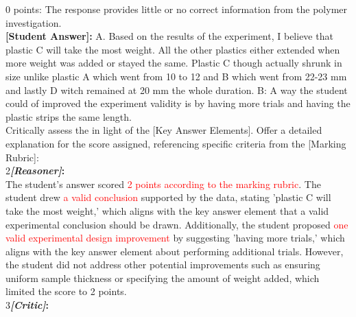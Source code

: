 \begin{figure*}
\begin{tcolorbox}[
    colback=gray!10,      %
    colframe=gray!80,     %
    title=Case Study 4,
    fonttitle=\bfseries,  %
    rounded corners,
    boxrule=0.5mm,        %
    width=\linewidth
]
0 points: The response provides little or no correct information from the polymer investigation.\\
 \textbf{[Student Answer]:} A. Based on the results of the experiment, I believe that plastic C will take the most weight. All the other plastics either extended when more weight was added or stayed the same. Plastic C though actually shrunk in size unlike plastic A which went from 10 to 12 and B which went from 22-23 mm and lastly D witch remained at 20 mm the whole duration. B: A way the student could of improved the experiment validity is by having more trials and having the plastic strips the same length.\\
 Critically assess the  in light of the [Key Answer Elements]. Offer a detailed explanation for the score assigned, referencing specific criteria from the [Marking Rubric]: \\
\textcircled{\raisebox{-0.3pt} {\scriptsize2}}\textbf{\emph{[Reasoner]}:}\\
The student's answer scored \textcolor{red}{2 points according to the marking rubric}. The student drew \textcolor{red}{a valid conclusion} supported by the data, stating 'plastic C will take the most weight,' which aligns with the key answer element that a valid experimental conclusion should be drawn. Additionally, the student proposed \textcolor{red}{one valid experimental design improvement} by suggesting 'having more trials,' which aligns with the key answer element about performing additional trials. However, the student did not address other potential improvements such as ensuring uniform sample thickness or specifying the amount of weight added, which limited the score to 2 points.\\
\textcircled{\raisebox{-0.3pt} {\scriptsize3}}\textbf{\emph{[Critic]}:}\\

\end{tcolorbox}
\end{figure*}
